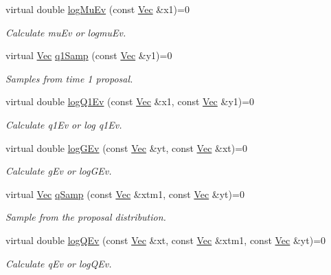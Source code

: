 \begin{DoxyCompactItemize}
virtual double \hyperlink{classBSFilter_a1c1084627bfaf2f3ccf882fc23240b7a}{log\+Mu\+Ev} (const \hyperlink{apf__filter_8h_a4c7df05c6f5e8a0d15ae14bcdbc07152}{Vec} \&x1)=0
\begin{DoxyCompactList}\small\item\em Calculate mu\+Ev or logmu\+Ev. \end{DoxyCompactList}\item 
virtual \hyperlink{apf__filter_8h_a4c7df05c6f5e8a0d15ae14bcdbc07152}{Vec} \hyperlink{classBSFilter_a9792df8f9b13495bc8bdcc53adeae347}{q1\+Samp} (const \hyperlink{apf__filter_8h_a4c7df05c6f5e8a0d15ae14bcdbc07152}{Vec} \&y1)=0
\begin{DoxyCompactList}\small\item\em Samples from time 1 proposal. \end{DoxyCompactList}\item 
virtual double \hyperlink{classBSFilter_a4d2bc2a2530306abaf1a717596b5814d}{log\+Q1\+Ev} (const \hyperlink{apf__filter_8h_a4c7df05c6f5e8a0d15ae14bcdbc07152}{Vec} \&x1, const \hyperlink{apf__filter_8h_a4c7df05c6f5e8a0d15ae14bcdbc07152}{Vec} \&y1)=0
\begin{DoxyCompactList}\small\item\em Calculate q1\+Ev or log q1\+Ev. \end{DoxyCompactList}\item 
virtual double \hyperlink{classBSFilter_aa612efc58f9442a7f6401a5edf0c2799}{log\+G\+Ev} (const \hyperlink{apf__filter_8h_a4c7df05c6f5e8a0d15ae14bcdbc07152}{Vec} \&yt, const \hyperlink{apf__filter_8h_a4c7df05c6f5e8a0d15ae14bcdbc07152}{Vec} \&xt)=0
\begin{DoxyCompactList}\small\item\em Calculate g\+Ev or log\+G\+Ev. \end{DoxyCompactList}\item 
virtual \hyperlink{apf__filter_8h_a4c7df05c6f5e8a0d15ae14bcdbc07152}{Vec} \hyperlink{classBSFilter_ac23ed2dc31035a7b1f5e1ce21ac66869}{q\+Samp} (const \hyperlink{apf__filter_8h_a4c7df05c6f5e8a0d15ae14bcdbc07152}{Vec} \&xtm1, const \hyperlink{apf__filter_8h_a4c7df05c6f5e8a0d15ae14bcdbc07152}{Vec} \&yt)=0
\begin{DoxyCompactList}\small\item\em Sample from the proposal distribution. \end{DoxyCompactList}\item 
virtual double \hyperlink{classBSFilter_aed949f0e0533ea3f781f7b3088596784}{log\+Q\+Ev} (const \hyperlink{apf__filter_8h_a4c7df05c6f5e8a0d15ae14bcdbc07152}{Vec} \&xt, const \hyperlink{apf__filter_8h_a4c7df05c6f5e8a0d15ae14bcdbc07152}{Vec} \&xtm1, const \hyperlink{apf__filter_8h_a4c7df05c6f5e8a0d15ae14bcdbc07152}{Vec} \&yt)=0
\begin{DoxyCompactList}\small\item\em Calculate q\+Ev or log\+Q\+Ev. \end{DoxyCompactList}\end{DoxyCompactItemize}


